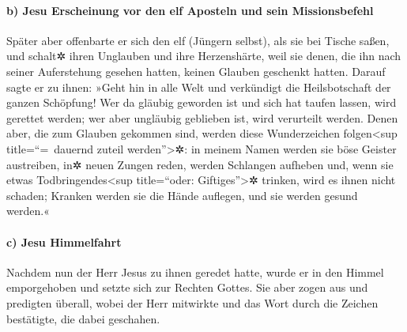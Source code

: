 \hypertarget{b-jesu-erscheinung-vor-den-elf-aposteln-und-sein-missionsbefehl}{%
\paragraph{b) Jesu Erscheinung vor den elf Aposteln und sein
Missionsbefehl}\label{b-jesu-erscheinung-vor-den-elf-aposteln-und-sein-missionsbefehl}}

 Später aber offenbarte er sich den elf (Jüngern selbst),
als sie bei Tische saßen, und schalt✲ ihren Unglauben und ihre
Herzenshärte, weil sie denen, die ihn nach seiner Auferstehung gesehen
hatten, keinen Glauben geschenkt hatten.  Darauf sagte er
zu ihnen: »Geht hin in alle Welt und verkündigt die Heilsbotschaft der
ganzen Schöpfung!  Wer da gläubig geworden ist und sich
hat taufen lassen, wird gerettet werden; wer aber ungläubig geblieben
ist, wird verurteilt werden.  Denen aber, die zum Glauben
gekommen sind, werden diese Wunderzeichen folgen\textless sup
title=``=~dauernd zuteil werden''\textgreater✲: in meinem Namen werden
sie böse Geister austreiben, in✲ neuen Zungen reden, 
werden Schlangen aufheben und, wenn sie etwas Todbringendes\textless sup
title=``oder: Giftiges''\textgreater✲ trinken, wird es ihnen nicht
schaden; Kranken werden sie die Hände auflegen, und sie werden gesund
werden.«

\hypertarget{c-jesu-himmelfahrt}{%
\paragraph{c) Jesu Himmelfahrt}\label{c-jesu-himmelfahrt}}

 Nachdem nun der Herr Jesus zu ihnen geredet hatte, wurde
er in den Himmel emporgehoben und setzte sich zur Rechten Gottes.
 Sie aber zogen aus und predigten überall, wobei der Herr
mitwirkte und das Wort durch die Zeichen bestätigte, die dabei
geschahen.
